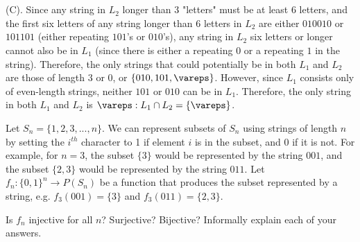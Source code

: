\documentclass[solution, letterpaper]{cs121}
\begin{document}
\\\\(C). Since any string in $L_2$ longer than $3$ "letters" must be at least $6$ letters, and the first six letters of any string longer than $6$ letters in $L_2$ are either $010010$ or $101101$ (either repeating $101$'s or $010$'s), any string in $L_2$ six letters or longer cannot also be in $L_1$ (since there is either a repeating $0$ or a repeating $1$ in the string).  Therefore, the only strings that could potentially be in both $L_1$ and $L_2$ are those of length $3$ or $0$, or $\{010, 101, \vareps\}$.  However, since $L_1$ consists only of even-length strings, neither $101$ or $010$ can be in $L_1$.  Therefore, the only string in both $L_1$ and $L_2$ is $\vareps: L_1 \cap L_2 = \{\vareps\}$.

Let $S_n = \{1, 2, 3, ..., n\}$. We can represent subsets of $S_n$ using strings of length $n$ by setting the $i^{th}$ character to 1 if element $i$ is in the subset, and 0 if it is not. For example, for $n = 3$, the subset $\{3\}$ would be represented by the string $001$, and the subset $\{2, 3\}$ would be represented by the string $011$. Let $f_n : \{0, 1\}^n \to P(S_n) $ be a function that produces the subset represented by a string, e.g. $f_3(001) = \{3\}$ and $f_3(011) = \{2, 3\}$.

\subproblem Is $f_n$ injective for all $n$? Surjective? Bijective? Informally explain each of your answers.
\end{document}
